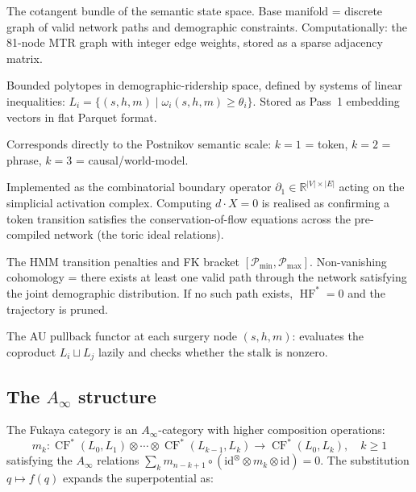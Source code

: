 \documentclass[11pt,a4paper]{article}
\DeclareMathOperator{\HF}{HF}
\DeclareMathOperator{\CF}{CF}
\begin{document}
\begin{description}[leftmargin=2cm, style=nextline]
  \item[Symplectic manifold $M$]
    The cotangent bundle of the semantic state space.
    Base manifold = discrete graph of valid network paths and
    demographic constraints.
    Computationally: the 81-node MTR graph with integer edge weights,
    stored as a sparse adjacency matrix.

  \item[Lagrangian submanifolds $L_i$]
    Bounded polytopes in demographic-ridership space, defined by
    systems of linear inequalities:
    $L_i = \{(s,h,m) \mid \omega_i(s,h,m) \geq \theta_i\}$.
    Stored as Pass~1 embedding vectors in flat Parquet format.

  \item[Chain grading $k$]
    Corresponds directly to the Postnikov semantic scale:
    $k=1$ = token, $k=2$ = phrase, $k=3$ = causal/world-model.

  \item[Differential $d$]
    Implemented as the combinatorial boundary operator
    $\partial_1 \in \mathbb{R}^{|V|\times|E|}$ acting on the
    simplicial activation complex.
    Computing $d \cdot X = 0$ is realised as confirming a token
    transition satisfies the conservation-of-flow equations
    across the pre-compiled network (the toric ideal relations).

  \item[Energy functional / $\HF^* \neq 0$]
    The HMM transition penalties and FK bracket
    $[\mathcal{P}_{\min}, \mathcal{P}_{\max}]$.
    Non-vanishing cohomology = there exists at least one valid
    path through the network satisfying the joint demographic
    distribution.
    If no such path exists, $\HF^* = 0$ and the trajectory is pruned.

  \item[Continuation map $\Phi$]
    The AU pullback functor at each surgery node $(s,h,m)$:
    evaluates the coproduct $L_i \sqcup L_j$ lazily and checks
    whether the stalk is nonzero.
\end{description}

\subsection{The $A_\infty$ structure}

The Fukaya category is an $A_\infty$-category with higher
composition operations:
\[
  m_k : \CF^*(L_0,L_1) \otimes \cdots \otimes
        \CF^*(L_{k-1},L_k) \to \CF^*(L_0,L_k), \quad k \geq 1
\]
satisfying the $A_\infty$ relations
$\sum_{k} m_{n-k+1}\circ(\mathrm{id}^{\otimes}\otimes m_k \otimes
\mathrm{id}) = 0$.
The substitution $q \mapsto f(q)$ expands the superpotential as:
\end{document}

